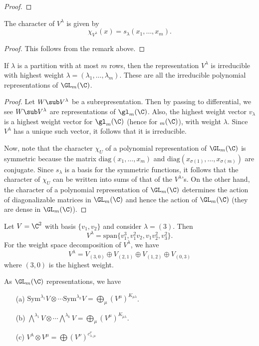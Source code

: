 \begin{proof}

\end{proof}
\begin{proposition}
The character of $V^\lambda$ is given by
\[\chi_{V^\lambda}(x)=s_\lambda(x_1,\dots,x_m).\]
\end{proposition}
\begin{proof}
This follows from the remark above.
\end{proof}
\begin{proposition}
If $\lambda$ is a partition with at most $m$ rows, then the representation $V^\lambda$ is irreducible with highest weight $\lambda=(\lambda_1,\dots,\lambda_m)$. These are all the irreducible polynomial representations of $\GL_m(\C)$.
\end{proposition}
\begin{proof}
Let $W\sub V^\lambda$ be a subrepresentation. Then by passing to differential, we see $W\sub V^\lambda$ are representations of $\gl_m(\C)$. Also, the highest weight vector $v_\lambda$ is a highest weight vector for $\gl_m(\C)$ (hence for $\sl_m(\C)$), with weight $\lambda$. Since $V^\lambda$ has a unique such vector, it follows that it is irreducible.\par
Now, note that the character $\chi_U$ of a polynomial representation of $\GL_m(\C)$ is symmetric because the matrix $\mathrm{diag}(x_1,\dots,x_m)$ and $\mathrm{diag}(x_{\sigma(1)},\dots,x_{\sigma(m)})$ are conjugate. Since $s_\lambda$ is a basis for the symmetric functions, it follows that the character of $\chi_U$ can be written into sums of that of the $V^\lambda$'s. On the other hand, the character of a polynomial representation of $\GL_m(\C)$ determines the action of diagonalizable matrices in $\GL_m(\C)$ and hence the action of $\GL_m(\C)$ (they are dense in $\GL_m(\C)$).
\end{proof}
\begin{example}
Let $V=\C^2$ with basis $\{v_1,v_2\}$ and consider $\lambda=(3)$. Then
\[V^\lambda=\mathrm{span}\{v_1^3,v_1^2v_2,v_1v_2^2,v_3^2\}.\]
For the weight space decomposition of $V^\lambda$, we have
\[V^\lambda=V_{(3,0)}\oplus V_{(2,1)}\oplus V_{(1,2)}\oplus V_{(0,3)}\]
where $(3,0)$ is the highest weight.
\end{example}
\begin{proposition}
As $\GL_m(\C)$ representations, we have
\begin{itemize}
\item[(a)] $\mathrm{Sym}^{\lambda_1}V\otimes\cdots \mathrm{Sym}^{\lambda_k}V=\bigoplus_\mu(V^\mu)^{K_{\mu\lambda}}$.
\item[(b)] $\bigwedge^{\lambda_1}V\otimes\cdots\bigwedge^{\lambda_k}V=\bigoplus_\mu(V^\mu)^{K_{\tilde{\mu}\lambda}}$.
\item[(c)]  $V^\lambda\otimes V^\mu=\bigoplus(V^\nu)^{c_{\lambda,\mu}^{\nu}}$
\end{itemize}
\end{proposition}
